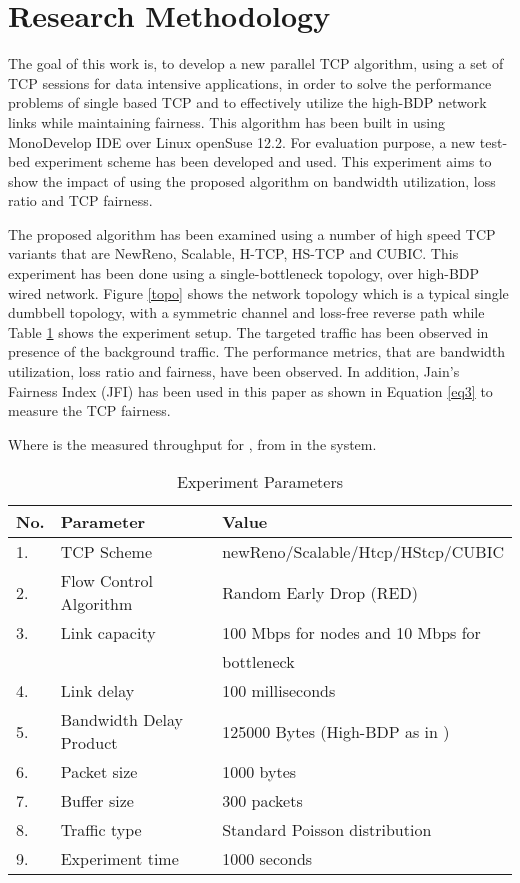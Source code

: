 \documentclass[a4paper, conference]{IEEEtran}
\begin{document}
\section{Research Methodology}

The goal of this work is, to develop a new parallel TCP algorithm, using a set of TCP sessions for data intensive applications, in order to solve the performance problems of single based TCP and to effectively utilize the high-BDP network links while maintaining fairness. This algorithm has been built in  using MonoDevelop IDE over Linux openSuse 12.2. For evaluation purpose, a new test-bed experiment scheme \cite{AlrshahThesis} has been developed and used. This experiment aims to show the impact of using the proposed algorithm on bandwidth utilization, loss ratio and TCP fairness. 

The proposed algorithm has been examined using a number of high speed TCP variants that are NewReno, Scalable, H-TCP, HS-TCP and CUBIC. This experiment has been done using a single-bottleneck topology, over high-BDP wired network. Figure \ref{topo} \cite{alrshah2009} shows the network topology which is a typical single dumbbell topology, with a symmetric channel and loss-free reverse path while Table \ref{params} shows the experiment setup. The targeted traffic has been observed in presence of the background traffic. The performance metrics, that are bandwidth utilization, loss ratio and fairness, have been observed. In addition, Jain's Fairness Index (JFI) \cite{chiu1989,jain1984} has been used in this paper as shown in Equation \ref{eq3} to measure the TCP fairness.



Where  is the measured throughput for , from  in the system.

\begin{table}[h]
	\caption{Experiment Parameters}
	\begin{center}
	\begin{tabular}{p{0.2cm}p{3cm}p{4.2cm}} \hline
	No.& Parameter				 &	Value										\\ \hline
	1. & TCP Scheme			 	 &	newReno/Scalable/Htcp/HStcp/CUBIC			\\ 2. & Flow Control Algorithm  &	Random Early Drop (RED)						\\ 3. & Link capacity			 &	100 Mbps for nodes and 10 Mbps for			\\ & 						 &	bottleneck									\\ 4. & Link delay			 	 &	100 milliseconds							\\ 5. & Bandwidth Delay Product &	125000 Bytes (High-BDP as in \cite{RFC1072})\\ 6. & Packet size			 &	1000 bytes									\\ 7. & Buffer size			 &	300 packets									\\ 8. & Traffic type			 &	Standard Poisson distribution				\\ 9. & Experiment time		 &	1000 seconds								\\ \hline
	\end{tabular}
	\label{params}
	\end{center}
\end{table}
\end{document}
